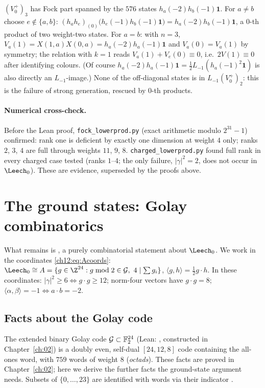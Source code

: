 \begin{example}\label{ch12:ex:weight3}
$(V_0^+)_3$ has Fock part spanned by the $576$ states $h_a(-2)h_b(-1)\mathbf 1$.  For $a\neq b$ choose $e\notin\{a,b\}$:
$(h_ah_e)_{(0)}\big(h_e(-1)h_b(-1)\mathbf 1\big)=h_a(-2)h_b(-1)\mathbf 1$, a $0$-th product of two weight-two states.
For $a=b$: with $n=3$, $V_a(1)=X(1,a)X(0,a)=h_a(-2)h_a(-1)\mathbf 1$ and $V_a(0)=V_a(1)$ by symmetry; the
relation with $k=1$ reads $V_a(1)+V_e(0)\equiv0$, i.e.\ $2V(1)\equiv0$ after identifying colours.  (Of course
$h_a(-2)h_a(-1)\mathbf 1=\tfrac12L_{-1}(h_a(-1)^2\mathbf 1)$ is also directly an $L_{-1}$-image.)  None of the
off-diagonal states is in $L_{-1}(V_0^+)_2$: this is the failure of strong generation, rescued by $0$-th
products.
\end{example}

\paragraph{Numerical cross-check.}  Before the Lean proof, \texttt{fock\_lowerprod.py} (exact arithmetic
modulo $2^{31}-1$) confirmed: rank one is deficient by exactly one dimension at weight $4$ only; ranks
$2$, $3$, $4$ are full through weights $11$, $9$, $8$.  \texttt{charged\_lowerprod.py} found full rank in
every charged case tested (ranks $1$--$4$; the only failure, $|\gamma|^2=2$, does not occur in $\Leech_0$).
These are evidence, superseded by the proofs above.

\section{The ground states: Golay combinatorics}\label{ch12:sec:ground}

What remains is , a purely combinatorial statement about $\Leech_0$.  We work in
the coordinates \eqref{ch12:eq:Acoords}: $\Leech_0\cong A=\{g\in\Z^{24}: g\bmod2\in\chtwelveG,\ 4\mid\sum
g_i\}$, $\langle g,h\rangle=\tfrac12g\cdot h$.  In these coordinates: $|\gamma|^2\ge6\iff g\cdot g\ge12$;
norm-four vectors have $g\cdot g=8$; $\langle\alpha,\beta\rangle=-1\iff a\cdot b=-2$.

\subsection{Facts about the Golay code}

The extended binary Golay code $\mathcal{G}\subset\mathbb F_2^{24}$ (Lean: , constructed in
Chapter~\ref{ch:02}) is a doubly even, self-dual $[24,12,8]$ code containing the all-ones word, with $759$
words of weight $8$ (\emph{octads}).  These facts are proved in Chapter~\ref{ch:02}; here we derive the
further facts the ground-state argument needs.  Subsets of $\{0,\dots,23\}$ are identified with words via
their indicator .

